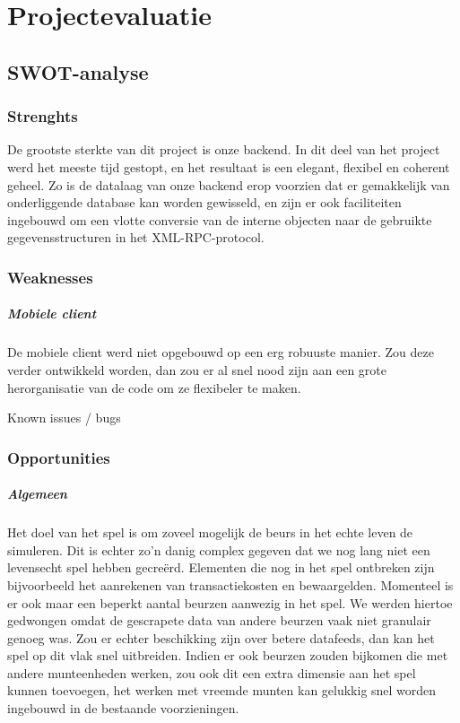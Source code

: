 \chapter{Projectevaluatie}


\section{SWOT-analyse}

\subsection{Strenghts}

De grootste sterkte van dit project is onze backend. In dit deel van het project werd het meeste tijd gestopt, en het resultaat is een elegant, flexibel en coherent geheel. 
Zo is de datalaag van onze backend erop voorzien dat er gemakkelijk van onderliggende database kan worden gewisseld, en zijn er ook faciliteiten ingebouwd om een vlotte conversie van de interne objecten naar de gebruikte gegevensstructuren in het XML-RPC-protocol.


\subsection{Weaknesses}

\paragraph{Mobiele client} De mobiele client werd niet opgebouwd op een erg robuuste manier. Zou deze verder ontwikkeld worden, dan zou er al snel nood zijn aan een grote herorganisatie van de code om ze flexibeler te maken.

\todo Known issues / bugs

\subsection{Opportunities}

\paragraph{Algemeen} Het doel van het spel is om zoveel mogelijk de beurs in het echte leven de simuleren. Dit is echter zo'n danig complex gegeven dat we nog lang niet een levensecht spel hebben gecre\"erd. Elementen die nog in het spel ontbreken zijn bijvoorbeeld het aanrekenen van transactiekosten en bewaargelden. 
Momenteel is er ook maar een beperkt aantal beurzen aanwezig in het spel. We werden hiertoe gedwongen omdat de gescrapete data van andere beurzen vaak niet granulair genoeg was. Zou er echter beschikking zijn over betere datafeeds, dan kan het spel op dit vlak snel uitbreiden. Indien er ook beurzen zouden bijkomen die met andere munteenheden werken, zou ook dit een extra dimensie aan het spel kunnen toevoegen, het werken met vreemde munten kan gelukkig snel worden ingebouwd in de bestaande voorzieningen.

